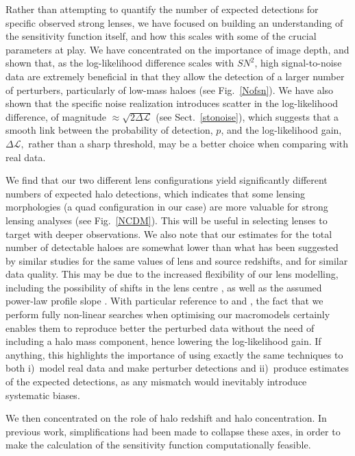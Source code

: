 \documentclass[a4paper, fleqn, usenatbib, useAMS]{mnras}
\def\DL{\Delta\mathscr{L}}
\begin{document}
Rather than attempting to quantify the number of expected detections for 
specific observed strong lenses, we have focused on building an understanding
of the sensitivity function itself, and how this scales with some of the crucial 
parameters at play. We have concentrated on the importance of image 
depth, and 
shown that, as the log-likelihood difference %
scales with $SN^2$, high signal-to-noise data are extremely beneficial in that they allow
the detection of a larger number of perturbers, particularly of low-mass 
haloes (see Fig.~\ref{Nofsn}). We have also shown that the specific noise realization introduces
scatter in the log-likelihood difference, of magnitude $\approx\sqrt{2\DL}$ 
(see Sect.~\ref{stonoise}), 
which suggests that a smooth link
between the probability of detection, $p$, and the log-likelihood
gain, $\DL,$ rather than a sharp threshold, 
may be a better choice {when comparing with} real data. 

We find that our two different lens configurations yield significantly different
numbers of expected halo detections, which indicates that some lensing morphologies
(a quad configuration in our case) are more valuable for strong lensing 
analyses (see Fig.~\ref{NCDM}). This will be useful in selecting
lenses to target with deeper observations.
We also note that our estimates for the total number of detectable haloes are 
somewhat lower than what has been suggested by similar studies for the same values of
lens and source redshifts, and for similar data quality. This may be due to 
the increased flexibility of our lens modelling, including the possibility of
shifts in the lens centre \citep[see][]{Vegetti2014}, as well as the assumed power-law profile slope \citep[see][]{Li2016, Despali2018}. 
With particular reference to \citet{Li2016} and \citet{Despali2018},
the fact that we perform fully non-linear searches when optimising our
macromodels certainly enables  
them to reproduce better the perturbed data without the need of including 
a halo mass component, hence lowering the log-likelihood gain. If anything, 
this highlights the importance of using exactly the same techniques to both i)~model 
real data and make perturber detections and ii)~produce estimates of the expected 
detections, as any mismatch would inevitably introduce systematic biases. 

We then concentrated on the role of halo redshift 
and halo concentration. In previous work, 
simplifications had been made to collapse these axes, in order to make
the calculation of the sensitivity function computationally feasible. 
\end{document}
